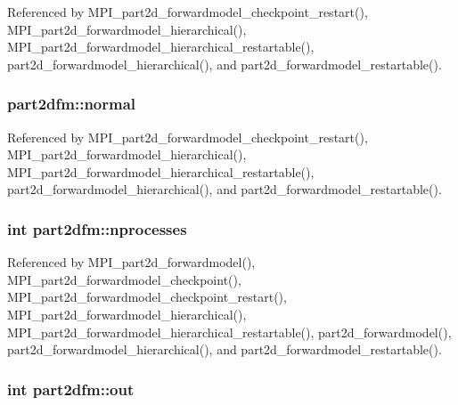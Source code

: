 Referenced by M\+P\+I\+\_\+part2d\+\_\+forwardmodel\+\_\+checkpoint\+\_\+restart(), M\+P\+I\+\_\+part2d\+\_\+forwardmodel\+\_\+hierarchical(), M\+P\+I\+\_\+part2d\+\_\+forwardmodel\+\_\+hierarchical\+\_\+restartable(), part2d\+\_\+forwardmodel\+\_\+hierarchical(), and part2d\+\_\+forwardmodel\+\_\+restartable().

\subsubsection[{\texorpdfstring{normal}{normal}}]{ part2dfm\+::normal}\hypertarget{structpart2dfm_ad29ffc1189a4cad01a99f50fef2bf0ba}{}\label{structpart2dfm_ad29ffc1189a4cad01a99f50fef2bf0ba}


Referenced by M\+P\+I\+\_\+part2d\+\_\+forwardmodel\+\_\+checkpoint\+\_\+restart(), M\+P\+I\+\_\+part2d\+\_\+forwardmodel\+\_\+hierarchical(), M\+P\+I\+\_\+part2d\+\_\+forwardmodel\+\_\+hierarchical\+\_\+restartable(), part2d\+\_\+forwardmodel\+\_\+hierarchical(), and part2d\+\_\+forwardmodel\+\_\+restartable().

\subsubsection[{\texorpdfstring{nprocesses}{nprocesses}}]{\setlength{\rightskip}{0pt plus 5cm}int part2dfm\+::nprocesses}\hypertarget{structpart2dfm_a9d5bf1d22e9b4ef82a99c9ddf819f442}{}\label{structpart2dfm_a9d5bf1d22e9b4ef82a99c9ddf819f442}


Referenced by M\+P\+I\+\_\+part2d\+\_\+forwardmodel(), M\+P\+I\+\_\+part2d\+\_\+forwardmodel\+\_\+checkpoint(), M\+P\+I\+\_\+part2d\+\_\+forwardmodel\+\_\+checkpoint\+\_\+restart(), M\+P\+I\+\_\+part2d\+\_\+forwardmodel\+\_\+hierarchical(), M\+P\+I\+\_\+part2d\+\_\+forwardmodel\+\_\+hierarchical\+\_\+restartable(), part2d\+\_\+forwardmodel(), part2d\+\_\+forwardmodel\+\_\+hierarchical(), and part2d\+\_\+forwardmodel\+\_\+restartable().

\subsubsection[{\texorpdfstring{out}{out}}]{\setlength{\rightskip}{0pt plus 5cm}int part2dfm\+::out}\hypertarget{structpart2dfm_a3d98012e3410c80ada60035faf82dbb1}{}\label{structpart2dfm_a3d98012e3410c80ada60035faf82dbb1}


